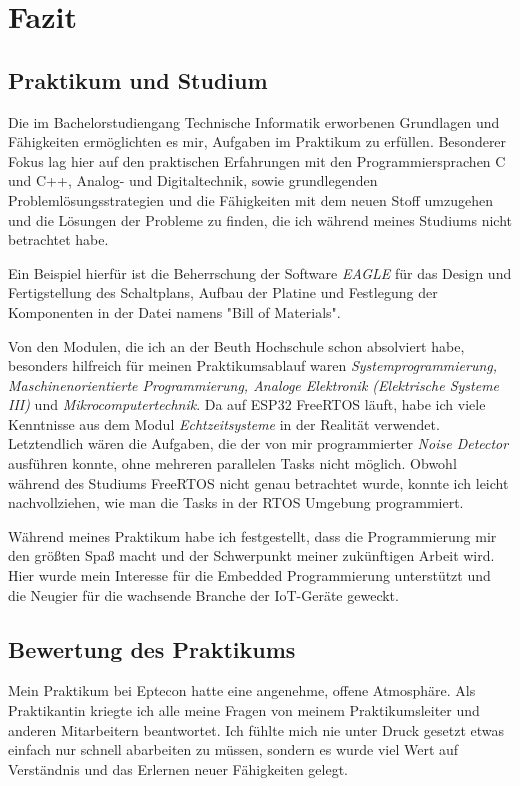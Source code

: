 \chapter{Fazit}
\section{Praktikum und Studium}
Die im Bachelorstudiengang Technische Informatik erworbenen Grundlagen und Fähigkeiten ermöglichten es mir, Aufgaben im Praktikum zu erfüllen. Besonderer Fokus lag hier auf den praktischen Erfahrungen mit den Programmiersprachen C und C++, Analog- und Digitaltechnik, sowie grundlegenden Problemlösungsstrategien und die Fähigkeiten mit dem neuen Stoff umzugehen und die Lösungen der Probleme zu finden, die ich während meines Studiums nicht betrachtet habe.

Ein Beispiel hierfür ist die Beherrschung der Software \textit{EAGLE} für das Design und Fertigstellung des Schaltplans, Aufbau der Platine und Festlegung der Komponenten in der Datei namens "Bill of Materials".

Von den Modulen, die ich an der Beuth Hochschule schon absolviert habe, besonders hilfreich für meinen Praktikumsablauf waren \textit{Systemprogrammierung, Maschinenorientierte Programmierung, Analoge Elektronik (Elektrische Systeme III)} und \textit{Mikrocomputertechnik}. Da auf ESP32 FreeRTOS läuft, habe ich viele Kenntnisse aus dem Modul \textit{Echtzeitsysteme} in der Realität verwendet. Letztendlich wären die Aufgaben, die der von mir programmierter \textit{Noise Detector} ausführen konnte, ohne mehreren parallelen Tasks nicht möglich. Obwohl während des Studiums FreeRTOS nicht genau betrachtet wurde, konnte ich leicht nachvollziehen, wie man die Tasks in der RTOS Umgebung programmiert. 

Während meines Praktikum habe ich festgestellt, dass die Programmierung mir den größten Spaß macht und der Schwerpunkt meiner zukünftigen Arbeit wird. Hier wurde mein Interesse für die Embedded Programmierung unterstützt und die Neugier für die wachsende Branche der IoT-Geräte geweckt.

\section{Bewertung des Praktikums}

Mein Praktikum bei Eptecon hatte eine angenehme, offene Atmosphäre. Als Praktikantin kriegte ich alle meine Fragen von meinem Praktikumsleiter und anderen Mitarbeitern beantwortet. Ich fühlte mich nie unter Druck gesetzt etwas einfach nur schnell abarbeiten zu müssen, sondern es wurde viel Wert auf Verständnis und das Erlernen neuer Fähigkeiten gelegt. 

